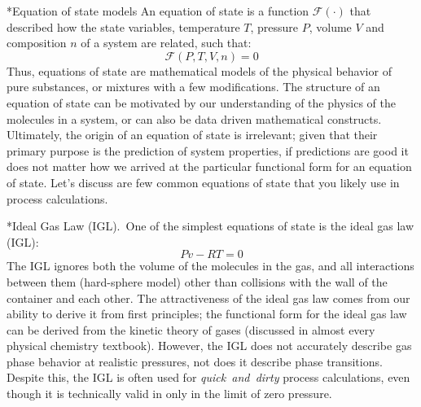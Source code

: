 \documentclass[11pt]{article}
\makeatletter
\theoremstyle{definition}
\renewcommand\subsection{\@startsection
	{subsection}{2}{0mm}
	{-0.05in}
	{0.5\baselineskip}
	{\normalfont\normalsize\bfseries}}
\renewcommand\subsubsection{\@startsection
	{subsubsection}{2}{0mm}
	{-0.05in}
	{-0.5\baselineskip}
	{\normalfont\normalsize\bfseries}}
\makeatother
\begin{document}
\subsection*{Equation of state models}
An equation of state is a function $\mathcal{F}(\cdot)$ that described how the state variables, temperature $T$, pressure $P$, volume $V$ and composition $n$
of a system are related, such that:
\begin{equation}
\mathcal{F}\left(P,T,V,n\right) = 0
\end{equation}
Thus, equations of state are mathematical models of the physical behavior of pure substances, or mixtures with a few modifications.
The structure of an equation of state can be motivated by our understanding of the physics of the molecules in a system, or can also be data driven mathematical constructs.
Ultimately, the origin of an equation of state is irrelevant; given that their primary purpose is the prediction of system properties, if predictions are good it does not
matter how we arrived at the particular functional form for an equation of state. Let's discuss are few common equations of state that you likely use in process
calculations.

\subsubsection*{Ideal Gas Law (IGL).}~One of the simplest equations of state is the ideal gas law (IGL):
\begin{equation}
  Pv-RT = 0
\end{equation}
The IGL ignores both the volume of the molecules in the gas, and all interactions between them (hard-sphere model)
other than collisions with the wall of the container and each other.
The attractiveness of the ideal gas law comes from our ability to derive it from first principles;
the functional form for the ideal gas law can be derived from the kinetic theory of gases (discussed in almost every physical chemistry textbook).
However, the IGL does not accurately describe gas phase behavior at realistic pressures, not does it describe phase transitions.
Despite this, the IGL is often used for \textit{quick~and~dirty} process calculations, even though it is technically valid in only in the
limit of zero pressure.
\end{document}
